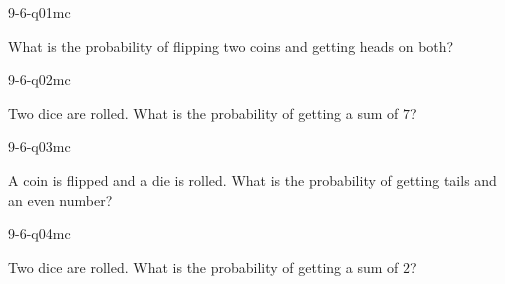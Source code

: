 

\begin{practiceQuestion}{9-6-q01}{mc}
\begin{questionText}
What is the probability of flipping two coins and getting heads on both?
\end{questionText}
\end{practiceQuestion}

\begin{practiceQuestion}{9-6-q02}{mc}
\begin{questionText}
Two dice are rolled. What is the probability of getting a sum of $7$?
\end{questionText}
\end{practiceQuestion}

\begin{practiceQuestion}{9-6-q03}{mc}
\begin{questionText}
A coin is flipped and a die is rolled. What is the probability of getting tails and an even number?
\end{questionText}
\end{practiceQuestion}

\begin{practiceQuestion}{9-6-q04}{mc}
\begin{questionText}
Two dice are rolled. What is the probability of getting a sum of $2$?
\end{questionText}
\end{practiceQuestion}


